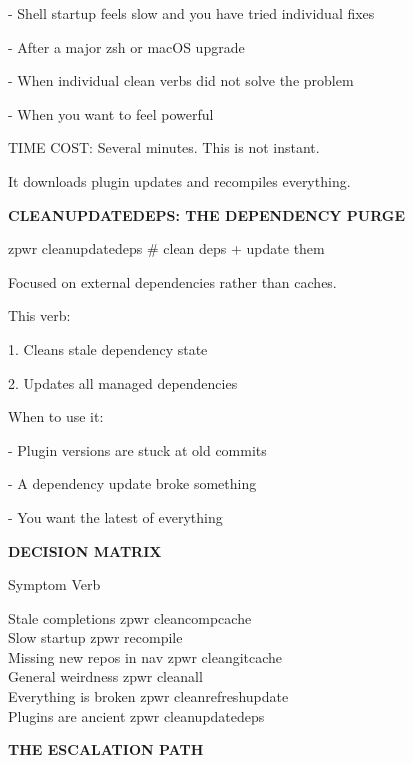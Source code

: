 \documentclass[11pt,a4paper,twoside]{book}
\begin{document}
- Shell startup feels slow and you have tried individual fixes

- After a major zsh or macOS upgrade

- When individual clean verbs did not solve the problem

- When you want to feel powerful

TIME COST: Several minutes. This is not instant.

It downloads plugin updates and recompiles everything.


\vspace{12pt}
{\bfseries\color{neonyellow} CLEANUPDATEDEPS: THE DEPENDENCY PURGE}\vspace{4pt}

\begin{codebox}
zpwr cleanupdatedeps                \# clean deps + update them\\
\end{codebox}

Focused on external dependencies rather than caches.

This verb:

1. Cleans stale dependency state

2. Updates all managed dependencies

When to use it:

- Plugin versions are stuck at old commits

- A dependency update broke something

- You want the latest of everything


\vspace{12pt}
{\bfseries\color{neonyellow} DECISION MATRIX}\vspace{4pt}

Symptom                          Verb

\begin{codebox}
Stale completions                zpwr cleancompcache\\
Slow startup                     zpwr recompile\\
Missing new repos in nav         zpwr cleangitcache\\
General weirdness                zpwr cleanall\\
Everything is broken              zpwr cleanrefreshupdate\\
Plugins are ancient               zpwr cleanupdatedeps\\
\end{codebox}


\vspace{12pt}
{\bfseries\color{neonyellow} THE ESCALATION PATH}\vspace{4pt}
\end{document}

